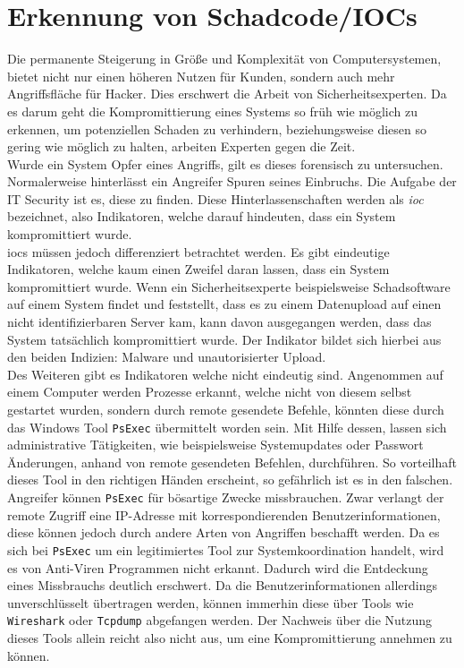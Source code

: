 \documentclass[
    12pt, %
    DIV10,
    ngerman, %
    a4paper, %
    oneside, %
    titlepage, %
    parskip=half, %
    headings=normal, %
    listof=totoc, %
    bibliography=totoc, %
    index=totoc, %
    captions=tableheading, %
    final %
]{scrreprt}
\begin{document}
\chapter{Erkennung von Schadcode/IOCs}\label{sec:ioc}
Die permanente Steigerung in Grö{\ss}e und Komplexität von Computersystemen, bietet nicht nur einen höheren Nutzen für Kunden, sondern auch mehr Angriffsfläche für Hacker. Dies erschwert die Arbeit von Sicherheitsexperten. Da es darum geht die Kompromittierung eines Systems so früh wie möglich zu erkennen, um potenziellen Schaden zu verhindern, beziehungsweise diesen so gering wie möglich zu halten, arbeiten Experten gegen die Zeit.\\
Wurde ein System Opfer eines Angriffs, gilt es dieses forensisch zu untersuchen. Normalerweise hinterlässt ein Angreifer Spuren seines Einbruchs. Die Aufgabe der IT Security ist es, diese zu finden. Diese Hinterlassenschaften werden als \emph{\acf{ioc}} bezeichnet, also Indikatoren, welche darauf hindeuten, dass ein System kompromittiert wurde.\\
%
\ac{iocs} müssen jedoch differenziert betrachtet werden. Es gibt eindeutige Indikatoren, welche kaum einen Zweifel daran lassen, dass ein System kompromittiert wurde. Wenn ein Sicherheitsexperte beispielsweise Schadsoftware auf einem System findet und feststellt, dass es zu einem Datenupload auf einen nicht identifizierbaren Server kam, kann davon ausgegangen werden, dass das System tatsächlich kompromittiert wurde. Der Indikator bildet sich hierbei aus den beiden Indizien: Malware und unautorisierter Upload.\\
Des Weiteren gibt es Indikatoren welche nicht eindeutig sind. Angenommen auf einem Computer werden Prozesse erkannt, welche nicht von diesem selbst gestartet wurden, sondern durch remote gesendete Befehle, könnten diese durch das Windows Tool \texttt{PsExec} übermittelt worden sein. Mit Hilfe dessen, lassen sich administrative Tätigkeiten, wie beispielsweise Systemupdates oder Passwort Änderungen, anhand von remote gesendeten Befehlen, durchführen. So vorteilhaft dieses Tool in den richtigen Händen erscheint, so gefährlich ist es in den falschen. Angreifer können \texttt{PsExec} für bösartige Zwecke missbrauchen. Zwar verlangt der remote Zugriff eine IP-Adresse mit korrespondierenden Benutzerinformationen, diese können jedoch durch andere Arten von Angriffen beschafft werden. Da es sich bei \texttt{PsExec} um ein legitimiertes Tool zur Systemkoordination handelt, wird es von Anti-Viren Programmen nicht erkannt. Dadurch wird die Entdeckung eines Missbrauchs deutlich erschwert. Da die Benutzerinformationen allerdings unverschlüsselt übertragen werden, können immerhin diese über Tools wie \texttt{Wireshark} oder \texttt{Tcpdump} abgefangen werden. Der Nachweis über die Nutzung dieses Tools allein reicht also nicht aus, um eine Kompromittierung annehmen zu können.
\end{document}
